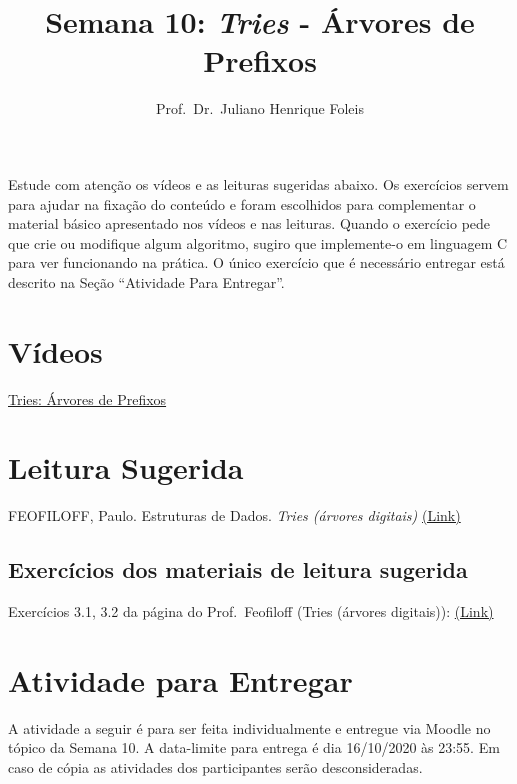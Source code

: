 \documentclass[]{article}
\title{Semana 10: \emph{Tries} - Árvores de Prefixos}
\author{Prof.~Dr.~Juliano Henrique Foleis}
\date{}
\begin{document}
\maketitle

Estude com atenção os vídeos e as leituras sugeridas abaixo. Os
exercícios servem para ajudar na fixação do conteúdo e foram escolhidos
para complementar o material básico apresentado nos vídeos e nas
leituras. Quando o exercício pede que crie ou modifique algum algoritmo,
sugiro que implemente-o em linguagem C para ver funcionando na prática.
O único exercício que é necessário entregar está descrito na Seção
``Atividade Para Entregar''.

\hypertarget{vuxeddeos}{%
\section{Vídeos}\label{vuxeddeos}}

\href{https://youtu.be/Spmw4hTo7ek}{Tries: Árvores de Prefixos}

\hypertarget{leitura-sugerida}{%
\section{Leitura Sugerida}\label{leitura-sugerida}}

FEOFILOFF, Paulo. Estruturas de Dados. \emph{Tries (árvores digitais)}
\href{https://www.ime.usp.br/~pf/estruturas-de-dados/aulas/tries.html}{(Link)}

\hypertarget{exercuxedcios-dos-materiais-de-leitura-sugerida}{%
\subsection{Exercícios dos materiais de leitura
sugerida}\label{exercuxedcios-dos-materiais-de-leitura-sugerida}}

Exercícios 3.1, 3.2 da página do Prof.~Feofiloff (Tries (árvores
digitais)):
\href{https://www.ime.usp.br/~pf/estruturas-de-dados/aulas/tries.html}{(Link)}

\hypertarget{atividade-para-entregar}{%
\section{Atividade para Entregar}\label{atividade-para-entregar}}

A atividade a seguir é para ser feita individualmente e entregue via
Moodle no tópico da Semana 10. A data-limite para entrega é dia
16/10/2020 às 23:55. Em caso de cópia as atividades dos participantes
serão desconsideradas.
\end{document}
